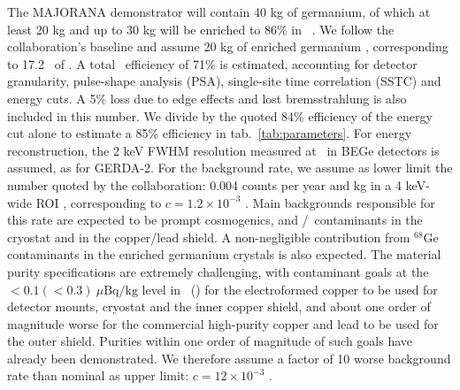 The MAJORANA demonstrator will contain 40 kg of germanium, of which at least 20 kg and up to 30 kg will be enriched to 86\% in \GE\ \cite{Majorana:2011vap}. We follow the collaboration's baseline and assume 20 kg of enriched germanium \cite{Wilkerson:2012ga}, corresponding to 17.2 \kgbb\ of \GE. A total \bbonu\ efficiency of 71\% is estimated, accounting for detector granularity, pulse-shape analysis (PSA), single-site time correlation (SSTC) and energy cuts. A 5\% loss due to edge effects and lost bremsstrahlung is also included in this number. We divide by the quoted 84\% efficiency of the energy cut alone to estimate a 85\% efficiency in tab.~\ref{tab:parameters}. For energy reconstruction, the 2 keV FWHM resolution measured at \Qbb\ in BEGe detectors \cite{Agostini:2010ke} is assumed, as for GERDA-2. For the background rate, we assume as lower limit the number quoted by the collaboration: 0.004 counts per year and kg in a 4 keV-wide ROI \cite{Majorana:2011vap}, corresponding to $c=1.2\times 10^{-3}$ \ckkbby. Main backgrounds responsible for this rate are expected to be prompt cosmogenics, and \TL/\BI\ contaminants in the cryostat and in the copper/lead shield. A non-negligible contribution from $^{68}$Ge contaminants in the enriched germanium crystals is also expected. The material purity specifications are extremely challenging, with contaminant goals at the $<0.1 (<0.3)\ \mu\mathrm{Bq/kg}$ level in \TL\ (\BI) for the electroformed copper to be used for detector mounts, cryostat and the inner copper shield, and about one order of magnitude worse for the commercial high-purity copper and lead to be used for the outer shield. Purities within one order of magnitude of such goals have already been demonstrated. We therefore assume a factor of 10 worse background rate than nominal as upper limit: $c=12\times 10^{-3}$ \ckkbby.


